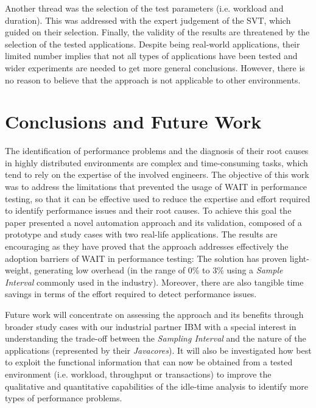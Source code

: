 \documentclass[runningheads,a4paper]{llncs}
\begin{document}
Another thread was the selection of the test parameters (i.e. workload and
duration). This was addressed with the expert judgement of the SVT, which guided
on their selection. Finally, the validity of the results are threatened by the
selection of the tested applications. Despite being real-world applications,
their limited number implies that not all types of applications have been tested
and wider experiments are needed to get more general conclusions. However, there
is no reason to believe that the approach is not applicable to other environments.


\section{Conclusions and Future Work}

The identification of performance problems and the diagnosis of their root
causes in highly distributed environments are complex and time-consuming tasks,
which tend to rely on the expertise of the involved engineers. The objective of
this work was to address the limitations that prevented the usage of WAIT in
performance testing, so that it can be effective used to reduce the expertise
and effort required to identify performance issues and their root causes. To
achieve this goal the paper presented a novel automation approach and its
validation, composed of a prototype and study cases with two real-life
applications. The results are encouraging as they have proved that the approach
addresses effectively the adoption barriers of WAIT in performance testing: The
solution has proven light-weight, generating low overhead (in the range of 0\%
to 3\% using a \emph{Sample Interval} commonly used in the industry). Moreover,
there are also tangible time savings in terms of the effort required to detect
performance issues.

Future work will concentrate on assessing the approach and its benefits through
broader study cases with our industrial partner IBM with a special interest in
understanding the trade-off between the \emph{Sampling Interval} and the nature
of the applications (represented by their \emph{Javacores}). It will also be
investigated how best to exploit the functional information that can now be
obtained from a tested environment (i.e. workload, throughput or transactions)
to improve the qualitative and quantitative capabilities of the idle-time
analysis to identify more types of performance problems.
\end{document}
